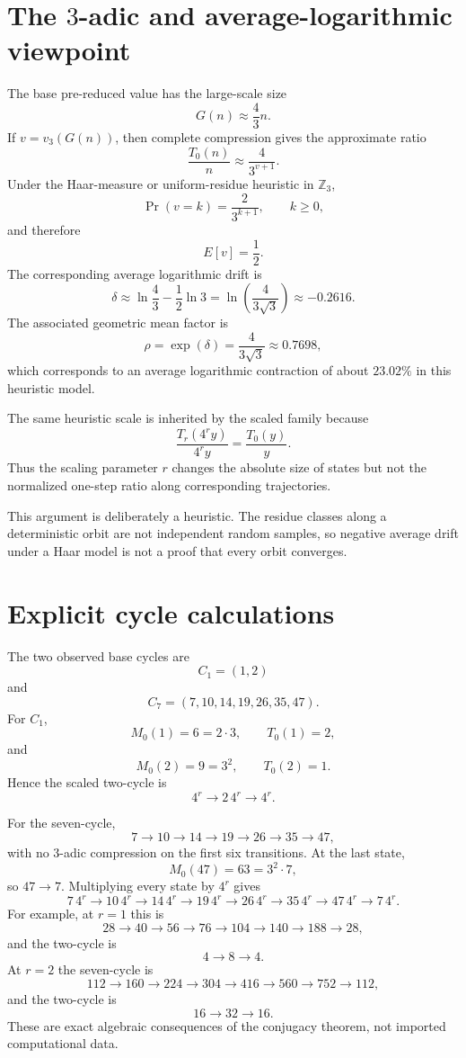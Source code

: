 \documentclass[11pt]{article}
\begin{document}
\section{The $3$-adic and average-logarithmic viewpoint}
The base pre-reduced value has the large-scale size
\[
G(n)\approx\frac43n.
\]
If $v=v_3(G(n))$, then complete compression gives the approximate ratio
\[
\frac{T_0(n)}n\approx\frac{4}{3^{v+1}}.
\]
Under the Haar-measure or uniform-residue heuristic in $\mathbb Z_3$,
\[
\Pr(v=k)=\frac{2}{3^{k+1}},\qquad k\ge0,
\]
and therefore
\[
E[v]=\frac12.
\]
The corresponding average logarithmic drift is
\[
\delta\approx\ln\frac43-\frac12\ln3
=\ln\left(\frac{4}{3\sqrt3}\right)
\approx-0.2616.
\]
The associated geometric mean factor is
\[
\rho=\exp(\delta)=\frac{4}{3\sqrt3}\approx0.7698,
\]
which corresponds to an average logarithmic contraction of about $23.02\%$ in this heuristic model.

The same heuristic scale is inherited by the scaled family because
\[
\frac{T_r(4^ry)}{4^ry}=\frac{T_0(y)}y.
\]
Thus the scaling parameter $r$ changes the absolute size of states but not the normalized one-step ratio along corresponding trajectories.

This argument is deliberately a heuristic. The residue classes along a deterministic orbit are not independent random samples, so negative average drift under a Haar model is not a proof that every orbit converges.

\section{Explicit cycle calculations}
The two observed base cycles are
\[
C_1=(1,2)
\]
and
\[
C_7=(7,10,14,19,26,35,47).
\]
For $C_1$,
\[
M_0(1)=6=2\cdot3,\qquad T_0(1)=2,
\]
and
\[
M_0(2)=9=3^2,\qquad T_0(2)=1.
\]
Hence the scaled two-cycle is
\[
4^r\to2\,4^r\to4^r.
\]

For the seven-cycle,
\[
7\to10\to14\to19\to26\to35\to47,
\]
with no $3$-adic compression on the first six transitions. At the last state,
\[
M_0(47)=63=3^2\cdot7,
\]
so $47\to7$. Multiplying every state by $4^r$ gives
\[
7\,4^r\to10\,4^r\to14\,4^r\to19\,4^r\to26\,4^r\to35\,4^r\to47\,4^r\to7\,4^r.
\]
For example, at $r=1$ this is
\[
28\to40\to56\to76\to104\to140\to188\to28,
\]
and the two-cycle is
\[
4\to8\to4.
\]
At $r=2$ the seven-cycle is
\[
112\to160\to224\to304\to416\to560\to752\to112,
\]
and the two-cycle is
\[
16\to32\to16.
\]
These are exact algebraic consequences of the conjugacy theorem, not imported computational data.
\end{document}
